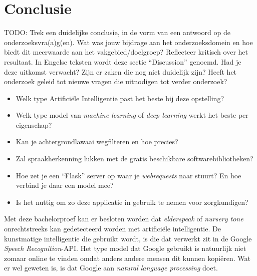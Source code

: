 
\chapter{Conclusie}
\label{ch:conclusie}



\color{blue}
TODO: Trek een duidelijke conclusie, in de vorm van een antwoord op de
 onderzoeksvra(a)g(en). Wat was jouw bijdrage aan het onderzoeksdomein en
 hoe biedt dit meerwaarde aan het vakgebied/doelgroep?
 Reflecteer kritisch over het resultaat. In Engelse teksten wordt deze sectie
 ``Discussion'' genoemd. Had je deze uitkomst verwacht? Zijn er zaken die nog
 niet duidelijk zijn?
 Heeft het onderzoek geleid tot nieuwe vragen die uitnodigen tot verder
onderzoek?


\begin{itemize}
    \item Welk type Artificiële Intelligentie past het beste bij deze opstelling?
    \item Welk type model van \textit{machine learning} of \textit{deep learning} werkt het beste per eigenschap?
    \item Kan je achtergrondlawaai wegfilteren en hoe precies?
    \item Zal spraakherkenning lukken met de gratis beschikbare softwarebibliotheken?
    \item Hoe zet je een ``Flask'' server op waar je \textit{webrequests} naar stuurt? En hoe verbind je daar een model mee?
    \item Is het nuttig om zo deze applicatie in gebruik te nemen voor zorgkundigen?
\end{itemize}

\color{black}

Met deze bachelorproef kan er besloten worden dat \textit{elderspeak} of \textit{nursery tone} onrechtstreeks kan gedetecteerd worden met artificiële intelligentie. De kunstmatige intelligentie die gebruikt wordt, is die dat verwerkt zit in de Google \textit{Speech Recognition}-API.
Het type model dat Google gebruikt is natuurlijk niet zomaar online te vinden omdat anders andere mensen dit kunnen kopiëren. Wat er wel geweten is, is dat Google aan \textit{natural language processing} doet.

